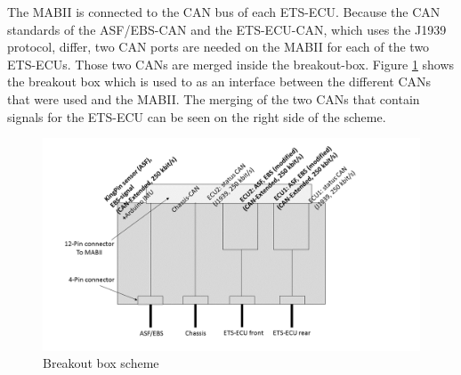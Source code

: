 \documentclass[ExampleMasters.tex]{subfiles}
\begin{document}
The \gls{MABII} is connected to the \gls{CAN} bus of each \gls{ETS}-ECU. Because the \gls{CAN} standards of the \gls{ASF}/\gls{EBS}-\gls{CAN} and the \gls{ETS}-\gls{ECU}-\gls{CAN}, which uses the J1939 protocol, differ, two \gls{CAN} ports are needed on the \gls{MABII} for each of the two \gls{ETS}-\gls{ECU}s. Those two \gls{CAN}s are merged inside the breakout-box. Figure \ref{fig:BOB} shows the breakout box which is used to as an interface between the different \gls{CAN}s that were used and the \gls{MABII}. The merging of the two \gls{CAN}s that contain signals for the \gls{ETS}-\gls{ECU} can be seen on the right side of the scheme.\\

\begin{figure}[!htb]
	\centering
	\includegraphics[width=1\linewidth]{figures/BOB_schema}
	\caption{Breakout box scheme}
	\label{fig:BOB}
\end{figure}
\\

	
\end{document}
